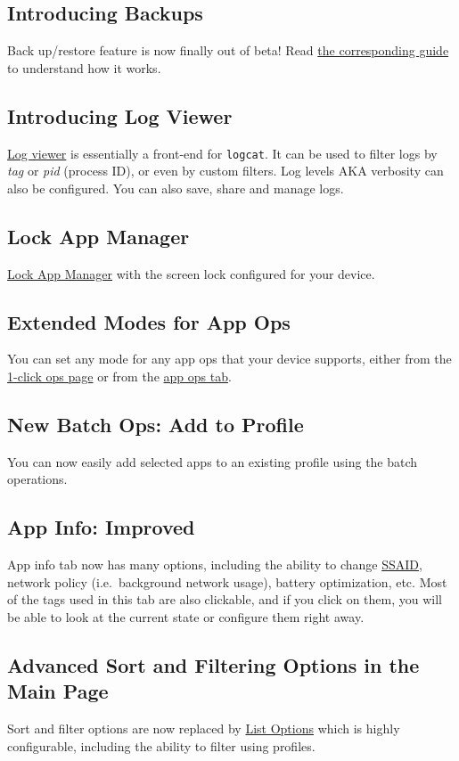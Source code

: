 \subsection{Introducing Backups}
Back up/restore feature is now finally out of beta!
Read \hyperref[sec:backup-restore]{the corresponding guide} to understand how it works.

\subsection{Introducing Log Viewer}
\hyperref[subsubsec:log-viewer]{Log viewer} is essentially a front-end for \texttt{logcat}.
It can be used to filter logs by \textit{tag} or \textit{pid} (process ID), or even by custom filters.
Log levels AKA verbosity can also be configured.
You can also save, share and manage logs.

\subsection{Lock App Manager}
\hyperref[subsubsec:screen-lock]{Lock App Manager} with the screen lock configured for your device.

\subsection{Extended Modes for App Ops}
You can set any mode for any app ops that your device supports, either from the
\hyperref[subsec:set-mode-for-app-ops-dots]{1-click ops page} or from the \hyperref[subsubsec:app-ops]{app ops tab}.

\subsection{New Batch Ops: Add to Profile}
You can now easily add selected apps to an existing profile using the batch operations.

\subsection{App Info: Improved}
App info tab now has many options, including the ability to change \hyperref[sec:terminologies]{SSAID}, network policy
(i.e.\ background network usage), battery optimization, etc.
Most of the tags used in this tab are also clickable, and if you click on them, you will be able to look at the current
state or configure them right away.

\subsection{Advanced Sort and Filtering Options in the Main Page}
Sort and filter options are now replaced by \hyperref[subsubsec:main-list-options]{List Options} which is highly configurable,
including the ability to filter using profiles.

